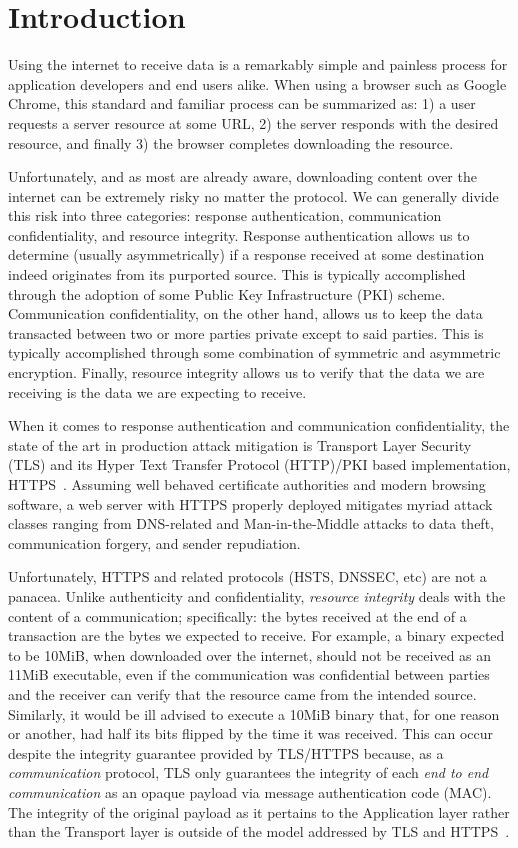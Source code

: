 \section{Introduction} \label{sec:introduction}

Using the internet to receive data is a remarkably simple and painless process
for application developers and end users alike. When using a browser such as
Google Chrome, this standard and familiar process can be summarized as: 1) a
user requests a server resource at some URL, 2) the server responds with the
desired resource, and finally 3) the browser completes downloading the resource.

Unfortunately, and as most are already aware, downloading content over the
internet can be extremely risky no matter the protocol. We can generally divide
this risk into three categories: response authentication, communication
confidentiality, and resource integrity. Response authentication allows us to
determine (usually asymmetrically) if a response received at some destination
indeed originates from its purported source. This is typically accomplished
through the adoption of some Public Key Infrastructure (PKI) scheme.
Communication confidentiality, on the other hand, allows us to keep the data
transacted between two or more parties private except to said parties. This is
typically accomplished through some combination of symmetric and asymmetric
encryption. Finally, resource integrity allows us to verify that the data we are
receiving is the data we are expecting to receive.

When it comes to response authentication and communication confidentiality, the
state of the art in production attack mitigation is Transport Layer Security
(TLS) and its Hyper Text Transfer Protocol (HTTP)/PKI based implementation,
HTTPS~\cite{TLS1.2, TLS1, TLS0}. Assuming well behaved certificate authorities
and modern browsing software, a web server with HTTPS properly deployed
mitigates myriad attack classes ranging from DNS-related and Man-in-the-Middle
attacks to data theft, communication forgery, and sender repudiation.

Unfortunately, HTTPS and related protocols (HSTS, DNSSEC, etc) are not a
panacea. Unlike authenticity and confidentiality, \textit{resource integrity}
deals with the content of a communication; specifically: the bytes received at
the end of a transaction are the bytes we expected to receive. For example, a
binary expected to be 10MiB, when downloaded over the internet, should not be
received as an 11MiB executable, even if the communication was confidential
between parties and the receiver can verify that the resource came from the
intended source. Similarly, it would be ill advised to execute a 10MiB binary
that, for one reason or another, had half its bits flipped by the time it was
received. This can occur despite the integrity guarantee provided by TLS/HTTPS
because, as a \textit{communication} protocol, TLS only guarantees the integrity
of each \textit{end to end communication} as an opaque payload via message
authentication code (MAC). The integrity of the original payload as it pertains
to the Application layer rather than the Transport layer is outside of the model
addressed by TLS and HTTPS~\cite{TLS1.2, HTTPS}.

